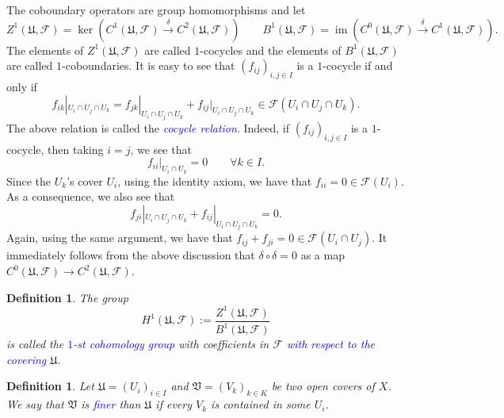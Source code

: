 \documentclass[12pt]{article}
\theoremstyle{thmstyle}
\theoremstyle{defstyle}
\newtheorem{definition}[theorem]{Definition}
\newcommand{\im}{\operatorname{im}}
\newcommand{\frakU}{\mathfrak{U}}
\newcommand{\frakV}{\mathfrak{V}}
\newcommand{\scrF}{\mathscr F}
\newcommand{\define}[1]{\textcolor{blue}{\textit{#1}}}
\begin{document}
The coboundary operators are group homomorphisms and let
\begin{equation*}
    Z^1(\frakU,\scrF) = \ker\left(C^1(\frakU,\scrF)\xrightarrow\delta C^2(\frakU,\scrF)\right)\qquad B^1(\frakU,\scrF) = \im\left(C^0(\frakU,\scrF)\xrightarrow{\delta} C^1(\frakU,\scrF)\right).
\end{equation*}
The elements of $Z^1(\frakU,\scrF)$ are called $1$-cocycles and the elements of $B^1(\frakU,\scrF)$ are called $1$-coboundaries. It is easy to see that $(f_{ij})_{i,j\in I}$ is a $1$-cocycle if and only if 
\begin{equation*}
    f_{ik}|_{U_i\cap U_j\cap U_k} = f_{jk}|_{U_i\cap U_j\cap U_k} + f_{ij}|_{U_i\cap U_j\cap U_k}\in\scrF(U_i\cap U_j\cap U_k).
\end{equation*}
The above relation is called the \define{cocycle relation}. Indeed, if $(f_{ij})_{i, j\in I}$ is a $1$-cocycle, then taking $i = j$, we see that 
\begin{equation*}
    f_{ii}|_{U_i\cap U_k} = 0\qquad\forall k\in I.
\end{equation*}
Since the $U_k$'s cover $U_i$, using the identity axiom, we have that $f_{ii} = 0\in\scrF(U_i)$. As a consequence, we also see that 
\begin{equation*}
    f_{ji}|_{U_i\cap U_j\cap U_k} + f_{ij}|_{U_i\cap U_j\cap U_k} = 0.
\end{equation*}
Again, using the same argument, we have that $f_{ij} + f_{ji} = 0\in\scrF(U_i\cap U_j)$. It immediately follows from the above discussion that $\delta\circ\delta = 0$ as a map $C^0(\frakU,\scrF)\to C^2(\frakU,\scrF)$.

\begin{definition}
    The group 
    \begin{equation*}
        H^1(\frakU,\scrF) := \frac{Z^1(\frakU,\scrF)}{B^1(\frakU,\scrF)}
    \end{equation*}
    is called the \define{$1$-st cohomology group} with coefficients in $\scrF$ \define{with respect to the covering} $\frakU$.
\end{definition}

\begin{definition}
    Let $\frakU = (U_i)_{i\in I}$ and $\frakV = (V_k)_{k\in K}$ be two open covers of $X$. We say that $\frakV$ is \define{finer} than $\frakU$ if every $V_k$ is contained in some $U_i$.
\end{definition}
\end{document}
